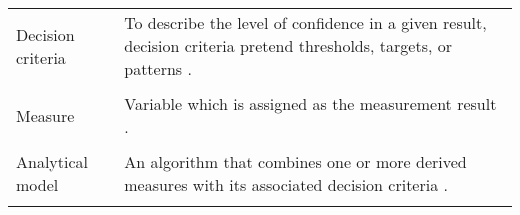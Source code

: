 \begin{center}
\begin{tabular}{ |L{4cm}|L{10cm}|  }
    & \\
    \hline
    Decision criteria & To describe the level of confidence in a given result, decision criteria pretend thresholds, targets, or patterns \cite{ISO_27004_2009}. \\
    & \\
    \hline
    Measure & Variable which is assigned as the measurement result \cite{ISO_27004_2009}. \\
    & \\
    \hline
    Analytical model & An algorithm that combines one or more derived measures with its associated decision criteria \cite{ISO_27004_2009}. \\
    & \\
    \hline
  \end{tabular}
\end{center}

